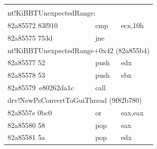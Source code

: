 \begin{table}\small %


\begin{center}










\tabcolsep=18pt


\begin{tabular}{|lll|}


\hline


\\[-9pt]


\multicolumn{3}{|l|}{{\sf nt!KiBBTUnexpectedRange:}}\\


{\sf 82a85572 83f910}&{\sf  cmp }    &{\sf ecx,10h}\\


{\sf 82a85575 753d}   &   {\sf jne}&\\


\multicolumn{3}{|l|}{{\sf nt!KiBBTUnexpectedRange+0x42 (82a855b4)}}\\


{\sf 82a85577 52} &       {\sf push}    &   {\sf edx}\\


{\sf 82a85578 53} &     {\sf   push}    &   {\sf ebx}\\


{\sf 82a85579\ e80262da1c}    &{\sf call}&\\


\multicolumn{3}{|l|}{{\sf drv!NewPsConvertToGuiThread (9f82b780)}}\\


{\sf 82a8557e 0bc0}   & {\sf   or}  &   {\sf eax,eax}\\


{\sf 82a85580 58}     &   {\sf pop} & {\sf eax}\\


{\sf 82a85581 5a} &   {\sf pop}&  {\sf       edx}\\


\hline


\end{tabular}





\vspace*{-3pt}






\end{center}
\end{table}
